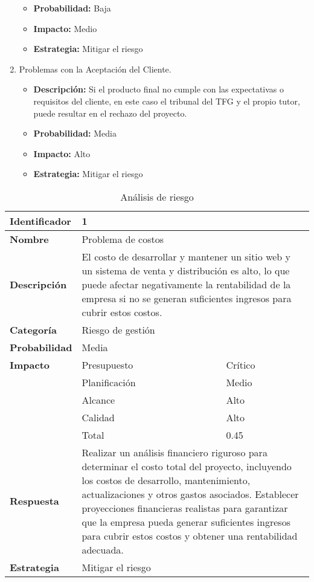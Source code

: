 \begin{enumerate}
\begin{itemize}
        \item \textbf{Probabilidad:} Baja
        \item \textbf{Impacto:} Medio
        \item \textbf{Estrategia:} Mitigar el riesgo
    \end{itemize}
    \item Problemas con la Aceptación del Cliente.
    \begin{itemize}
        \item \textbf{Descripción:} Si el producto final no cumple con las expectativas o requisitos del cliente, en este caso el tribunal del TFG y el propio tutor, puede resultar en el rechazo del proyecto.
        \item \textbf{Probabilidad:} Media
        \item \textbf{Impacto:} Alto
        \item \textbf{Estrategia:} Mitigar el riesgo
    \end{itemize}
\end{enumerate}


\begin{table}[htb]
    \centering
    \caption{Análisis de riesgo}
    \label{table:risk_analysis}
    \begin{tabular}{>{\columncolor{rowcolor}}l l l}
    \toprule
    \rowcolor{lightgreen}
    \textbf{Identificador} & \multicolumn{2}{l}{1} \\
    \midrule
    \textbf{Nombre} & \multicolumn{2}{l}{Problema de costos} \\
    \midrule
    \textbf{Descripción} & \multicolumn{2}{p{10cm}}{El costo de desarrollar y mantener un sitio web y un sistema de venta y distribución es alto, lo que puede afectar negativamente la rentabilidad de la empresa si no se generan suficientes ingresos para cubrir estos costos.} \\
    \midrule
    \textbf{Categoría} & \multicolumn{2}{l}{Riesgo de gestión} \\
    \midrule
    \textbf{Probabilidad} & \multicolumn{2}{l}{Media} \\
    \midrule
    \textbf{Impacto} & Presupuesto & Crítico \\
    \cmidrule(lr){2-3}
    & Planificación & Medio \\
    \cmidrule(lr){2-3}
    & Alcance & Alto \\
    \cmidrule(lr){2-3}
    & Calidad & Alto \\
    \cmidrule(lr){2-3}
    & Total & 0.45 \\
    \midrule
    \textbf{Respuesta} & \multicolumn{2}{p{10cm}}{Realizar un análisis financiero riguroso para determinar el costo total del proyecto, incluyendo los costos de desarrollo, mantenimiento, actualizaciones y otros gastos asociados. Establecer proyecciones financieras realistas para garantizar que la empresa pueda generar suficientes ingresos para cubrir estos costos y obtener una rentabilidad adecuada.} \\
    \midrule
    \textbf{Estrategia} & \multicolumn{2}{l}{Mitigar el riesgo} \\
    \bottomrule
    \end{tabular}
    \end{table}
